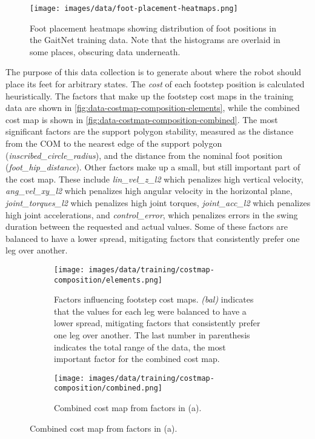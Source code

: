 \begin{figure}[H]
  \centering
  \texttt{[image: images/data/foot-placement-heatmaps.png]}
  \caption{Foot placement heatmaps showing distribution of foot
    positions in the GaitNet training data. Note that the histograms
  are overlaid in some places, obscuring data underneath.}
  \label{fig:data-cn-training-distribution}
\end{figure}

The purpose of this data collection is to generate about where the
robot should place
its feet for arbitrary states. The \textit{cost} of each footstep
position is calculated
heuristically. The factors that make up the footstep cost maps in the
training data
are shown in \autoref{fig:data-costmap-composition-elements}, while the
combined cost map is shown in \autoref{fig:data-costmap-composition-combined}.
The most significant factors are the support polygon stability,
measured as the distance from the COM to the nearest edge of the
support polygon (\textit{inscribed\_circle\_radius}), and the
distance from the nominal foot position
(\textit{foot\_hip\_distance}). Other factors make up a small, but
still important part of the cost map. These include
\textit{lin\_vel\_z\_l2} which penalizes high vertical velocity,
\textit{ang\_vel\_xy\_l2} which penalizes high angular velocity in
the horizontal plane, \textit{joint\_torques\_l2} which penalizes
high joint torques, \textit{joint\_acc\_l2} which penalizes high
joint accelerations, and \textit{control\_error}, which penalizes
errors in the swing duration between the requested and actual values.
Some of these factors are balanced to have a lower spread, mitigating
factors that consistently prefer one leg over another.

\begin{figure}[H]
  \centering
  \begin{subfigure}[T]{0.65\textwidth}
    \centering
    \texttt{[image: images/data/training/costmap-composition/elements.png]}
    \caption{Factors influencing footstep cost maps. \textit{(bal)}
      indicates that the values for each leg were balanced to have a
      lower spread, mitigating factors that consistently prefer one leg
      over another. The last number in parenthesis indicates the total
    range of the data, the most important factor for the combined cost map.}
    \label{fig:data-costmap-composition-elements}
  \end{subfigure}
  \hfill
  \begin{subfigure}[T]{0.3\textwidth}
    \centering
    \texttt{[image: images/data/training/costmap-composition/combined.png]}
    \caption{Combined cost map from factors in (a).}
    \label{fig:data-costmap-composition-combined}
  \end{subfigure}
  \hfill
\end{figure}

